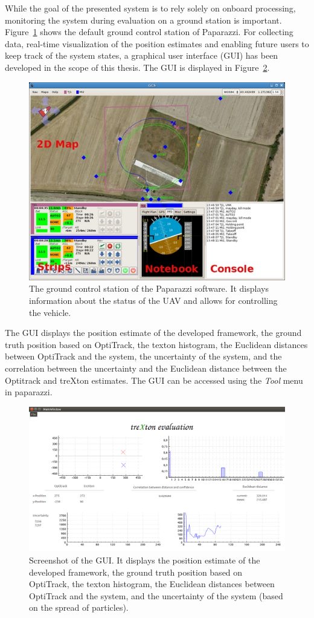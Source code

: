 \documentclass{report}
\begin{document}
While the goal of the presented system is to rely solely on onboard
processing, monitoring the system during evaluation on a ground
station is important. Figure~\ref{fig:gcs} shows the default ground
control station of Paparazzi. For collecting data, real-time
visualization of the position estimates and enabling future users to
keep track of the system states, a graphical user interface (GUI) has
been developed in the scope of this thesis. The GUI is displayed in
Figure~\ref{fig:gui}.
\begin{figure}[t]
\begin{center}
\includegraphics[width=0.7\columnwidth]{Gcs}
\caption{{\label{fig:gcs} The ground control station of the Paparazzi
    software. It displays information about the status of the UAV and
    allows for controlling the vehicle.%
  }}
\end{center}
\end{figure}
The GUI displays the position estimate of the developed framework, the
ground truth position based on OptiTrack, the texton histogram, the
Euclidean distances between OptiTrack and the system, the uncertainty
of the system, and the correlation between the uncertainty and the
Euclidean distance between the Optitrack and treXton estimates. The
GUI can be accessed using the \emph{Tool} menu in paparazzi.
\begin{figure}[t]
\begin{center}
\includegraphics[width=0.7\columnwidth]{gui-cut}
\caption{{\label{fig:gui} Screenshot of the GUI. It displays the
    position estimate of the developed framework, the ground truth
    position based on OptiTrack, the texton histogram, the Euclidean
    distances between OptiTrack and the system, and the uncertainty of
    the system (based on the spread of particles).%
  }}
\end{center}
\end{figure}
\end{document}
